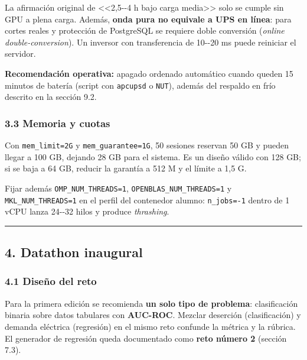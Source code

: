 \documentclass[11pt,a4paper]{article}
\begin{document}
La afirmación original de \textless\textless2,5-\/-4 h bajo carga media\textgreater\textgreater{} solo se cumple sin GPU a plena carga. Además, \textbf{onda pura no equivale a UPS en línea}: para cortes reales y protección de PostgreSQL se requiere doble conversión (\emph{online double-conversion}). Un inversor con transferencia de 10-\/-20 ms puede reiniciar el servidor.

\textbf{Recomendación operativa:} apagado ordenado automático cuando queden 15 minutos de batería (script con \texttt{apcupsd} o \texttt{NUT}), además del respaldo en frío descrito en la sección 9.2.

\hypertarget{33-memoria-y-cuotas}{%
\subsubsection{3.3 Memoria y cuotas}\label{33-memoria-y-cuotas}}

Con \texttt{mem\_\allowbreak{}limit=2G} y \texttt{mem\_\allowbreak{}guarantee=1G}, 50 sesiones reservan 50 GB y pueden llegar a 100 GB, dejando 28 GB para el sistema. Es un diseño válido con 128 GB; si se baja a 64 GB, reducir la garantía a 512 M y el límite a 1,5 G.

Fijar además \texttt{OMP\_\allowbreak{}NUM\_\allowbreak{}THREADS=1}, \texttt{OPENBLAS\_\allowbreak{}NUM\_\allowbreak{}THREADS=1} y \texttt{MKL\_\allowbreak{}NUM\_\allowbreak{}THREADS=1} en el perfil del contenedor alumno: \texttt{n\_\allowbreak{}jobs=-\allowbreak{}1} dentro de 1 vCPU lanza 24-\/-32 hilos y produce \emph{thrashing}.

\begin{center}\rule{0.5\linewidth}{0.5pt}\end{center}

\hypertarget{4-datathon-inaugural}{%
\subsection{4. Datathon inaugural}\label{4-datathon-inaugural}}

\hypertarget{41-diseuxf1o-del-reto}{%
\subsubsection{4.1 Diseño del reto}\label{41-diseuxf1o-del-reto}}

Para la primera edición se recomienda \textbf{un solo tipo de problema}: clasificación binaria sobre datos tabulares con \textbf{AUC-ROC}. Mezclar deserción (clasificación) y demanda eléctrica (regresión) en el mismo reto confunde la métrica y la rúbrica. El generador de regresión queda documentado como \textbf{reto número 2} (sección 7.3).
\end{document}
